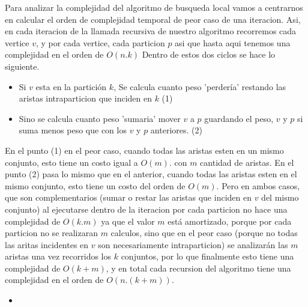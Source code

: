 Para analizar la complejidad del algoritmo de busqueda local vamos a centrarnos en calcular el orden de complejidad temporal de peor caso de una iteracion.
Asi, en cada iteracion de la llamada recursiva de nuestro algoritmo recorremos cada vertice $v$, y por cada vertice, cada particion $p$ asi que hasta aqui tenemos una complejidad en el orden de $O(n.k)$
Dentro de estos dos ciclos se hace lo siguiente.
\begin{itemize}
\item Si $v$ esta en la partición $k$, Se calcula cuanto peso 'perdería' restando las aristas intraparticion que inciden en $k$ (1)
\item Sino se calcula cuanto peso 'sumaria' mover $v$ a $p$ guardando el peso, $v$ y $p$ si suma menos peso que con los $v$ y $p$ anteriores. (2)
\end{itemize}
En el punto (1) en el peor caso, cuando todas las aristas esten en un mismo conjunto, esto tiene un costo igual a $O(m)$. con $m$ cantidad de aristas.  En el punto (2) pasa lo mismo que en el anterior, cuando todas las aristas esten en el mismo conjunto, esto tiene un costo del orden de $O(m)$.
Pero en ambos casos, que son complementarios (sumar o restar las aristas que inciden en $v$ del mismo conjunto) al ejecutarse dentro de la iteracion por cada particion no hace una complejidad de $O(k.m)$ ya que el valor $m$ está amortizado, porque por cada particion no se realizaran $m$ calculos, sino que en el peor caso (porque no todas las aritas incidentes en $v$ son necesariamente intraparticion) se analizarán las $m$ aristas una vez recorridos los $k$ conjuntos, por lo que finalmente esto tiene una complejidad de $O(k+m)$, y en total cada recursion del algoritmo tiene una complejidad en el orden de $O(n.(k+m))$.




\begin{itemize}
\item
\end{itemize}